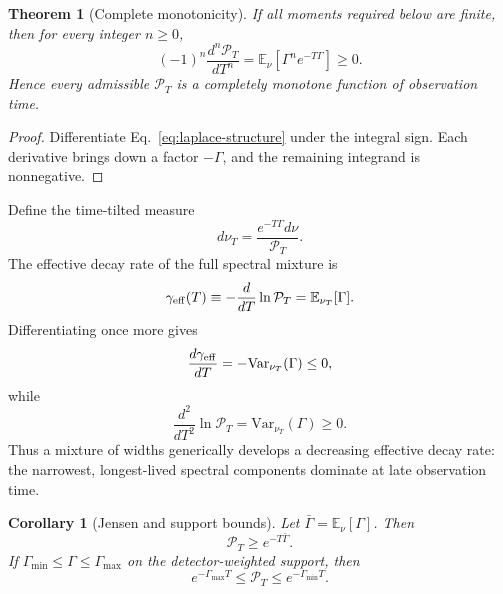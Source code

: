 \documentclass[11pt]{article}
\newtheorem{theorem}{Theorem}
\newtheorem{corollary}{Corollary}
\theoremstyle{remark}
\begin{document}
\begin{theorem}[Complete monotonicity]
If all moments required below are finite, then for every integer $n\ge0$,
\begin{equation}
 (-1)^n\frac{d^n\mathcal P_T}{dT^n}
 =\mathbb E_\nu[\Gamma^n e^{-T\Gamma}]\ge0.
 \label{eq:complete-monotone}
\end{equation}
Hence every admissible $\mathcal P_T$ is a completely monotone function of observation time.
\end{theorem}

\begin{proof}
Differentiate Eq.~\eqref{eq:laplace-structure} under the integral sign. Each derivative brings down a factor $-\Gamma$, and the remaining integrand is nonnegative.
\end{proof}

Define the time-tilted measure
\begin{equation}
 d\nu_T
 =\frac{e^{-T\Gamma}d\nu}{\mathcal P_T}.
\end{equation}
The effective decay rate of the full spectral mixture is
\begin{equation}
 \gamma_{\rm eff}(T)
 \equiv-\frac{d}{dT}\ln\mathcal P_T
 =\mathbb E_{\nu_T}[\Gamma].
 \label{eq:effective-decay-rate}
\end{equation}
Differentiating once more gives
\begin{equation}
 \frac{d\gamma_{\rm eff}}{dT}
 =-\mathrm{Var}_{\nu_T}(\Gamma)\le0,
 \label{eq:decay-rate-monotone}
\end{equation}
while
\begin{equation}
 \frac{d^2}{dT^2}\ln\mathcal P_T
 =\mathrm{Var}_{\nu_T}(\Gamma)\ge0.
 \label{eq:log-convex}
\end{equation}
Thus a mixture of widths generically develops a decreasing effective decay rate: the narrowest, longest-lived spectral components dominate at late observation time.

\begin{corollary}[Jensen and support bounds]
Let $\bar\Gamma=\mathbb E_\nu[\Gamma]$. Then
\begin{equation}
 \mathcal P_T\ge e^{-T\bar\Gamma}.
 \label{eq:jensen-particle}
\end{equation}
If $\Gamma_{\min}\le\Gamma\le\Gamma_{\max}$ on the detector-weighted support, then
\begin{equation}
 e^{-\Gamma_{\max}T}
 \le\mathcal P_T
 \le e^{-\Gamma_{\min}T}.
 \label{eq:width-sandwich}
\end{equation}
\end{corollary}
\end{document}

